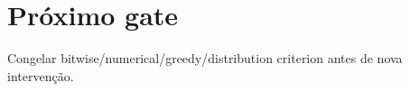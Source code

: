 \section{Próximo gate}
Congelar bitwise/numerical/greedy/distribution criterion antes de nova intervenção.
